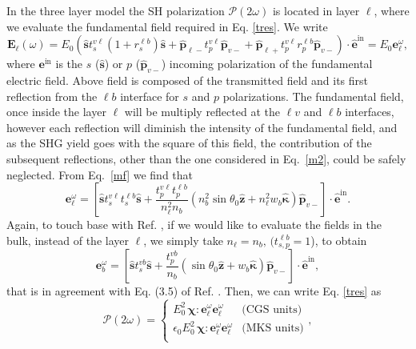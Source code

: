 In the three layer model the SH polarization $\boldsymbol{\mathcal{P}}(2\omega)$ is located in layer $\ell$,
where we evaluate the fundamental field required in Eq. \eqref{tres}.
We write
\begin{equation}\label{m2}
\mathbf{E}_{\ell}(\omega)=E_{0}\left(
\hat{\mathbf{s}} t^{v\ell}_s(1+r^{\ell b}_s)\hat{\mathbf{s}}
+
\hat{\mathbf{p}}_{\ell-}
 t^{v\ell}_{p}
\hat{\mathbf{p}}_{v-}
+
\hat{\mathbf{p}}_{\ell+}
t^{v\ell}_{p}r^{\ell b}_{p}
\hat{\mathbf{p}}_{v-}
\right)\cdot\hat{\mathbf{e}}^{\mathrm{in}}=E_{0}\mathbf{e}^\omega_{\ell}
,
\end{equation} 
where $\mathbf{e}^{\mathrm{in}}$ is the $s$ ($\hat{\mathbf{s}}$) or $p$
($\hat{\mathbf{p}}_{v-}$)
incoming polarization of
the fundamental electric field. 
Above field is composed of the transmitted field and its first
reflection from the $\ell b$ interface for $s$ and $p$ polarizations.
The fundamental field, once inside the layer $\ell$ will be multiply
reflected at the $\ell v$ and $\ell b$ interfaces, however each
reflection will diminish the intensity of the fundamental field, and as the SHG
yield goes with the square of this field, the contribution of the
subsequent reflections, other than the one considered in
Eq.~\eqref{m2},  could be safely neglected.
From Eq.~\eqref{mf}
we find that
\begin{equation}\label{m12}
\mathbf{e}^{\omega}_{\ell}
= \left[
\hat{\mathbf{s}}t_{s}^{v\ell}t_{s}^{\ell b}\hat{\mathbf{s}} 
+ \frac{t^{v\ell}_{p}t^{\ell b}_{p}}
       {n^2_\ell n_b}
\left(
  n^2_b
\sin\theta_{0}\hat{\mathbf{z}}
+ n^2_\ell w_b\hat{\boldsymbol{\kappa}}
\right)
\hat{\mathbf{p}}_{v-}
\right]
\cdot\hat{\mathbf{e}}^{\mathrm{in}}.  
\end{equation}  
Again, to touch base with Ref. \cite{mizrahiJOSA88},
if we would like to evaluate the fields in the bulk, instead of the layer
$\ell$, we simply take 
$n_\ell=n_b,\,(t^{\ell b}_{s,p}=1$), to obtain
\begin{equation}\label{m13}
\mathbf{e}^{\omega}_{b}
= \left[
\hat{\mathbf{s}}t_{s}^{vb}\hat{\mathbf{s}}
+ \frac{t^{vb}_{p}}{n_b}
\left(
\sin\theta_{0}\hat{\mathbf{z}} + w_b\hat{\boldsymbol{\kappa}}
\right) 
\hat{\mathbf{p}}_{v-}
\right]
\cdot\hat{\mathbf{e}}^{\mathrm{in}},  
\end{equation} 
that is in agreement with Eq. (3.5) of Ref. \cite{mizrahiJOSA88}.
Then,
 we can write Eq. \eqref{tres} as
\begin{equation}\label{m4}
\boldsymbol{\mathcal{P}}(2\omega) = 
\left\{
\begin{array}{cc}  
E^{2}_{0}\,\boldsymbol{\chi}:\mathbf{e}^{\omega}_{\ell}\mathbf{e}^{\omega}_{\ell}
& \text{(CGS units)} \\
\epsilon_{0}E^{2}_{0}\,\boldsymbol{\chi}:\mathbf{e}^{\omega}_{\ell}\mathbf{e}^{\omega}_{\ell}
& \text{(MKS units)} \\
\end{array}
\right.
,
\end{equation}
